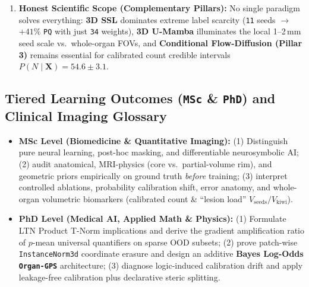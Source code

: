 \documentclass[10pt,a4paper]{article}
\begin{document}
\begin{enumerate}
    \item \textbf{Honest Scientific Scope (Complementary Pillars):} No single paradigm solves everything: \textbf{3D SSL} dominates extreme label scarcity (\texttt{11} seeds $\to$ $+41\%$ \texttt{PQ} with just \texttt{34} weights), \textbf{3D U-Mamba} illuminates the local 1--2\,mm seed scale vs.\ whole-organ FOVs, and \textbf{Conditional Flow-Diffusion (Pillar 3)} remains essential for calibrated count credible intervals $P(N \mid \mathbf{X}) = 54.6 \pm 3.1$.
\end{enumerate}

\subsection*{Tiered Learning Outcomes (\texttt{MSc} \& \texttt{PhD}) and Clinical Imaging Glossary}
\begin{itemize}
    \item \textbf{MSc Level (Biomedicine \& Quantitative Imaging):} (1) Distinguish pure neural learning, post-hoc masking, and differentiable neurosymbolic AI; (2) audit anatomical, MRI-physics (core vs.\ partial-volume rim), and geometric priors empirically on ground truth \textit{before} training; (3) interpret controlled ablations, probability calibration shift, error anatomy, and whole-organ volumetric biomarkers (calibrated count \& ``lesion load'' $V_{\text{seeds}}/V_{\text{kiwi}}$).
    \item \textbf{PhD Level (Medical AI, Applied Math \& Physics):} (1) Formulate LTN Product T-Norm implications and derive the gradient amplification ratio of $p$-mean universal quantifiers on sparse OOD subsets; (2) prove patch-wise \texttt{InstanceNorm3d} coordinate erasure and design an additive \textbf{Bayes Log-Odds \texttt{Organ-GPS}} architecture; (3) diagnose logic-induced calibration drift and apply leakage-free calibration plus declarative steric splitting.
\end{itemize}
\end{document}
